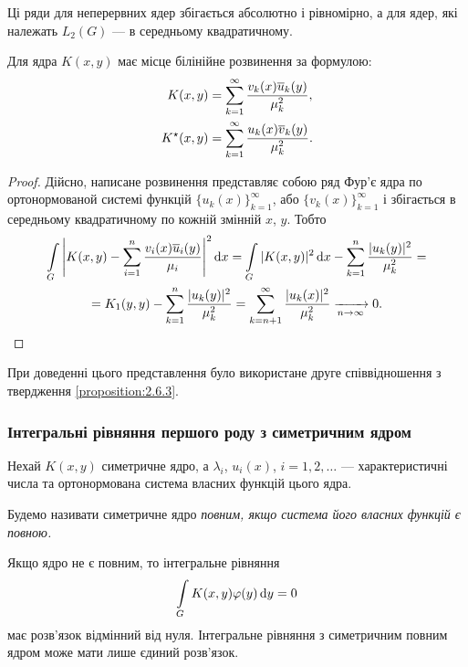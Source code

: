 Ці ряди для неперервних ядер збігається абсолютно і рівномірно, а для ядер, які належать $L_2(G)$ --- в середньому квадратичному.

\begin{proposition}
	\label{proposition:2.6.4}
	Для ядра $K(x,y)$ має місце білінійне розвинення за формулою:
	\begin{align}
		K(x,y)&=\displaystyle\sum\limits_{k=1}^\infty \dfrac{v_k(x)\overline u_k(y)}{\mu_k^2}, \\
		K^\star (x,y)&=\displaystyle\sum\limits_{k=1}^\infty \dfrac{u_k(x)\overline v_k(y)}{\mu_k^2}.
	\end{align}
\end{proposition}

\begin{proof}
	Дійсно, написане розвинення представляє собою ряд Фур'є ядра по ортонормованой системі функцій $\{u_k(x)\}_{k=1}^\infty$, або $\{v_k(x)\}_{k=1}^\infty$ і
	збігається в середньому квадратичному 
	по кожній змінній $x$, $y$. Тобто
	\begin{multline}
		\displaystyle\int\limits_G \left| K(x,y) - \displaystyle\sum\limits_{i=1}^n \dfrac{v_i(x) \overline u_i(y)}{\mu_i} \right|^2 \mathop{}\!\mathrm{d} x = \displaystyle\int\limits_G |K(x, y)|^2 \mathop{}\!\mathrm{d} x - \displaystyle\sum\limits_{k=1}^n \dfrac{|u_k(y)|^2}{\mu_k^2} = \\
		= K_1(y, y) - \displaystyle\sum\limits_{k=1}^n \dfrac{|u_k(y)|^2}{\mu_k^2} = \displaystyle\sum\limits_{k=n+1}^\infty \dfrac{|u_k(x)|^2}{\mu_k^2} \xrightarrow[n\to\infty]{} 0.
	\end{multline}
\end{proof}

\begin{remark}
	При доведенні цього представлення було використане друге співвідношення з твердження \ref{proposition:2.6.3}.
\end{remark}

\subsubsection{Інтегральні рівняння першого роду з симетричним ядром}

Нехай $K(x, y)$ симетричне ядро, а $\lambda_i$, $u_i(x)$, $i=1,2,\ldots$ --- характеристичні числа та ортонормована система власних функцій цього ядра.

\begin{definition}
	Будемо називати симетричне ядро \it{повним}, якщо система його власних функцій є повною.
\end{definition}

Якщо ядро не є повним, то інтегральне рівняння
\begin{equation}
    \displaystyle\int\limits_G K(x,y)\varphi(y)\mathop{}\!\mathrm{d} y=0
\end{equation}
має розв'язок відмінний від нуля. Інтегральне рівняння з симетричним повним ядром може мати лише єдиний розв'язок. \medskip

